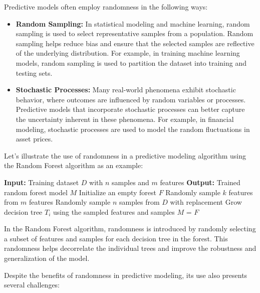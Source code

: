 \documentclass[12pt]{book} %
\begin{document}
Predictive models often employ randomness in the following ways:

\begin{itemize}
    \item \textbf{Random Sampling:} In statistical modeling and machine learning, random sampling is used to select representative samples from a population. Random sampling helps reduce bias and ensure that the selected samples are reflective of the underlying distribution. For example, in training machine learning models, random sampling is used to partition the dataset into training and testing sets.
    
    \item \textbf{Stochastic Processes:} Many real-world phenomena exhibit stochastic behavior, where outcomes are influenced by random variables or processes. Predictive models that incorporate stochastic processes can better capture the uncertainty inherent in these phenomena. For example, in financial modeling, stochastic processes are used to model the random fluctuations in asset prices.
\end{itemize}

Let's illustrate the use of randomness in a predictive modeling algorithm using the Random Forest algorithm as an example:
\FloatBarrier
\begin{algorithm}[H]
\caption{Random Forest Algorithm}
\begin{algorithmic}[1]
\State \textbf{Input:} Training dataset \(D\) with \(n\) samples and \(m\) features
\State \textbf{Output:} Trained random forest model \(M\)
\State Initialize an empty forest \(F\)
    \State Randomly sample \(k\) features from \(m\) features
    \State Randomly sample \(n\) samples from \(D\) with replacement
    \State Grow decision tree \(T_i\) using the sampled features and samples
\EndFor
\State \(M\) = \(F\)
\end{algorithmic}
\end{algorithm}
\FloatBarrier

In the Random Forest algorithm, randomness is introduced by randomly selecting a subset of features and samples for each decision tree in the forest. This randomness helps decorrelate the individual trees and improve the robustness and generalization of the model.

Despite the benefits of randomness in predictive modeling, its use also presents several challenges:
\end{document}
